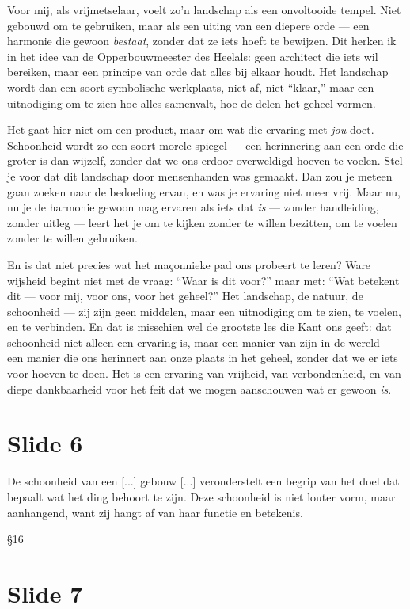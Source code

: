 \documentclass{article}
\begin{document}
Voor mij, als vrijmetselaar, voelt zo'n landschap als een onvoltooide tempel. Niet gebouwd om te gebruiken, maar als een uiting van een diepere orde --- een harmonie die gewoon \textit{bestaat}, zonder dat ze iets hoeft te bewijzen. Dit herken ik in het idee van de Opperbouwmeester des Heelals: geen architect die iets wil bereiken, maar een principe van orde dat alles bij elkaar houdt. Het landschap wordt dan een soort symbolische werkplaats, niet af, niet ``klaar,'' maar een uitnodiging om te zien hoe alles samenvalt, hoe de delen het geheel vormen.

Het gaat hier niet om een product, maar om wat die ervaring met \textit{jou} doet. Schoonheid wordt zo een soort morele spiegel --- een herinnering aan een orde die groter is dan wijzelf, zonder dat we ons erdoor overweldigd hoeven te voelen. Stel je voor dat dit landschap door mensenhanden was gemaakt. Dan zou je meteen gaan zoeken naar de bedoeling ervan, en was je ervaring niet meer vrij. Maar nu, nu je de harmonie gewoon mag ervaren als iets dat \textit{is} --- zonder handleiding, zonder uitleg --- leert het je om te kijken zonder te willen bezitten, om te voelen zonder te willen gebruiken.

En is dat niet precies wat het maçonnieke pad ons probeert te leren? Ware wijsheid begint niet met de vraag: ``Waar is dit voor?'' maar met: ``Wat betekent dit --- voor mij, voor ons, voor het geheel?'' Het landschap, de natuur, de schoonheid --- zij zijn geen middelen, maar een uitnodiging om te zien, te voelen, en te verbinden. En dat is misschien wel de grootste les die Kant ons geeft: dat schoonheid niet alleen een ervaring is, maar een manier van zijn in de wereld --- een manier die ons herinnert aan onze plaats in het geheel, zonder dat we er iets voor hoeven te doen. Het is een ervaring van vrijheid, van verbondenheid, en van diepe dankbaarheid voor het feit dat we mogen aanschouwen wat er gewoon \textit{is}.

\section*{Slide 6}

\epigraph{De schoonheid van een [...] gebouw [...] veronderstelt een begrip van het doel dat bepaalt wat het ding behoort te zijn. Deze schoonheid is niet louter vorm, maar aanhangend, want zij hangt af van haar functie en betekenis.}{§16}

\section*{Slide 7}
\end{document}
